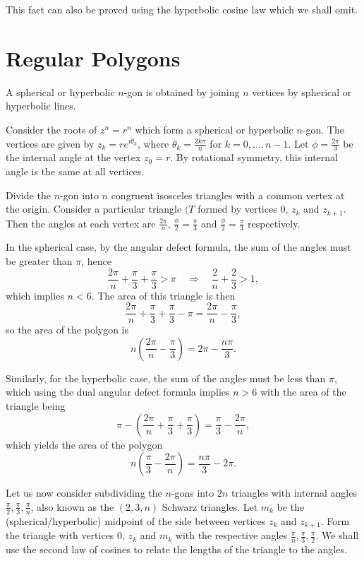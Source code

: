 \documentclass{article}
\begin{document}
This fact can also be proved using the hyperbolic cosine law which we shall omit.

\section{Regular Polygons}

A spherical or hyperbolic \(n\)-gon is obtained by joining \(n\) vertices by spherical or hyperbolic lines. 

Consider the roots of \(z^n =  r^n\) which form a spherical or hyperbolic \(n\)-gon. The vertices are given by \(z_k = re^{i\theta_k}\), where \(\theta_k = \frac{2k\pi}{n}\) for \(k = 0, \dots, n-1\). Let \(\phi = \frac{2\pi}{3}\) be the internal angle at the vertex \(z_0 = r\). By rotational symmetry, this internal angle is the same at all vertices.

Divide the \(n\)-gon into \(n\) congruent isosceles triangles with a common vertex at the origin. Consider a particular triangle \((T\) formed by vertices \(0\), \(z_k\) and \(z_{k+1}\). Then the angles at each vertex are \(\frac{2\pi}{n}\), \(\frac{\phi}{2} = \frac{\pi}{3}\) and \(\frac{\phi}{2} = \frac{\pi}{3}\) respectively. 

In the spherical case, by the angular defect formula, the sum of the angles must be greater than \(\pi\), hence
\[ \frac{2\pi}{n} + \frac{\pi}{3} + \frac{\pi}{3} > \pi \quad \Rightarrow \quad \frac{2}{n} + \frac{2}{3} > 1, \]
which implies \(n < 6\). The area of this triangle is then
\[ \frac{2\pi}{n} + \frac{\pi}{3} + \frac{\pi}{3} - \pi = \frac{2\pi}{n} - \frac{\pi}{3}, \]
so the area of the polygon is
\[ n\left(\frac{2\pi}{n} - \frac{\pi}{3}\right) = 2\pi - \frac{n\pi}{3}. \]

Similarly, for the hyperbolic case, the sum of the angles must be less than \(\pi\), which using the dual angular defect formula implies \(n > 6\) with the area of the triangle being
\[ \pi - \left(\frac{2\pi}{n} + \frac{\pi}{3} + \frac{\pi}{3}\right) = \frac{\pi}{3} - \frac{2\pi}{n},\]
which yields the area of the polygon
\[ n\left(\frac{\pi}{3} - \frac{2\pi}{n}\right) = \frac{n\pi}{3} - 2\pi. \]

Let us now consider subdividing the \(n\)-gons into \(2n\) triangles with internal angles \(\frac{\pi}{2}, \frac{\pi}{3}, \frac{\pi}{n}\), also known as the \((2, 3, n)\) Schwarz triangles. Let \(m_k\) be the (spherical/hyperbolic) midpoint of the side between vertices \(z_k\) and \(z_{k+1}\). Form the triangle with vertices \(0\), \(z_k\) and \(m_k\) with the respective angles \(\frac{\pi}{n}, \frac{\pi}{3}, \frac{\pi}{2}\). We shall use the second law of cosines to relate the lengths of the triangle to the angles. 
\end{document}
